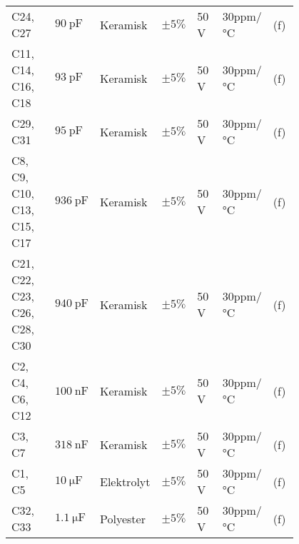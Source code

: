 \begin{table}[h!]
\begin{threeparttable}
\begin{tabular}{p{0.2\linewidth}p{0.1\linewidth}p{0.15\linewidth}p{0.05\linewidth}p{0.1\linewidth}p{0.1\linewidth}p{0.1\linewidth}}
C24, C27 & $\SI{90}{\pico\farad}$ & Keramisk & $\pm 5\%$ & 50 \si{\volt} & 30ppm/\si{\celsius} & (f)\\
C11, C14, C16, C18 & $\SI{93}{\pico\farad}$ & Keramisk & $\pm 5\%$ & 50 \si{\volt} & 30ppm/\si{\celsius} & (f)\\
C29, C31 & $\SI{95}{\pico\farad}$ & Keramisk & $\pm 5\%$ & 50 \si{\volt} & 30ppm/\si{\celsius} & (f)\\
C8, C9, C10, C13, C15, C17 & $\SI{936}{\pico\farad}$ & Keramisk & $\pm 5\%$ & 50 \si{\volt} & 30ppm/\si{\celsius} & (f)\\
C21, C22, C23, C26, C28, C30 & $\SI{940}{\pico\farad}$ & Keramisk & $\pm 5\%$ & 50 \si{\volt} & 30ppm/\si{\celsius} & (f)\\
C2, C4, C6, C12 & $\SI{100}{\nano\farad}$ & Keramisk & $\pm 5\%$ & 50 \si{\volt} & 30ppm/\si{\celsius} & (f)\\
C3, C7  & $\SI{318}{\nano\farad}$ & Keramisk & $\pm 5\%$ & 50 \si{\volt} & 30ppm/\si{\celsius} & (f)\\
C1, C5 & $\SI{10}{\micro\farad}$ & Elektrolyt & $\pm 5\%$ & 50 \si{\volt} & 30ppm/\si{\celsius} & (f)\\
C32, C33 & $\SI{1.1}{\micro\farad}$ & Polyester & $\pm 5\%$ & 50 \si{\volt} & 30ppm/\si{\celsius} & (f)\\


\end{tabular}
\end{threeparttable}
\end{table}
